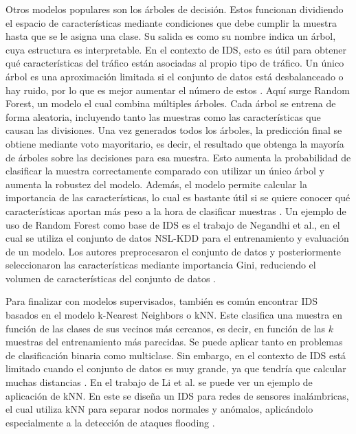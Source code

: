 Otros modelos populares son los árboles de decisión. Estos funcionan dividiendo el espacio de características mediante condiciones que debe cumplir la muestra hasta que se le asigna una clase. Su salida es como su nombre indica un árbol, cuya estructura es interpretable. En el contexto de IDS, esto es útil para obtener qué características del tráfico están asociadas al propio tipo de tráfico. Un único árbol es una aproximación limitada si el conjunto de datos está desbalanceado o hay ruido, por lo que es mejor aumentar el número de estos \cite{buczak2016survey}. Aquí surge Random Forest, un modelo el cual combina múltiples árboles. Cada árbol se entrena de forma aleatoria, incluyendo tanto las muestras como las características que causan las divisiones. Una vez generados todos los árboles, la predicción final se obtiene mediante voto mayoritario, es decir, el resultado que obtenga la mayoría de árboles sobre las decisiones para esa muestra. Esto aumenta la probabilidad de clasificar la muestra correctamente comparado con utilizar un único árbol y aumenta la robustez del modelo. Además, el modelo permite calcular la importancia de las características, lo cual es bastante útil si se quiere conocer qué características aportan más peso a la hora de clasificar muestras \cite{breiman2001randomforest}.
Un ejemplo de uso de Random Forest como base de IDS es el trabajo de Negandhi et al., en el cual se utiliza el conjunto de datos NSL-KDD para el entrenamiento y evaluación de un modelo. Los autores preprocesaron el conjunto de datos y posteriormente seleccionaron las características mediante importancia Gini, reduciendo el volumen de características del conjunto de datos \cite{negandhi2019randomforestnslkdd}.

Para finalizar con modelos supervisados, también es común encontrar IDS basados en el modelo k-Nearest Neighbors o kNN. Este clasifica una muestra en función de las clases de sus vecinos más cercanos, es decir, en función de las $k$ muestras del entrenamiento más parecidas. Se puede aplicar tanto en problemas de clasificación binaria como multiclase. Sin embargo, en el contexto de IDS está limitado cuando el conjunto de datos es muy grande, ya que tendría que calcular muchas distancias \cite{zamani2015mlids,buczak2016survey}. En el trabajo de Li et al. se puede ver un ejemplo de aplicación de kNN. En este se diseña un IDS para redes de sensores inalámbricas, el cual utiliza kNN para separar nodos normales y anómalos, aplicándolo especialmente a la detección de ataques flooding \cite{li2014knnwsnids}.

